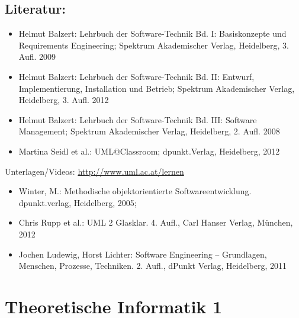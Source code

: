 \section*{Literatur:}\label{literatur-18}

\begin{itemize}
\item
  Helmut Balzert: Lehrbuch der Software-Technik Bd. I: Basiskonzepte und
  Requirements Engineering; Spektrum Akademischer Verlag, Heidelberg, 3.
  Aufl. 2009
\item
  Helmut Balzert: Lehrbuch der Software-Technik Bd. II: Entwurf,
  Implementierung, Installation und Betrieb; Spektrum Akademischer
  Verlag, Heidelberg, 3. Aufl. 2012
\item
  Helmut Balzert: Lehrbuch der Software-Technik Bd. III: Software
  Management; Spektrum Akademischer Verlag, Heidelberg, 2. Aufl. 2008
\item
  Martina Seidl et al.: UML@Classroom; dpunkt.Verlag, Heidelberg, 2012
\end{itemize}

Unterlagen/Videos: \url{http://www.uml.ac.at/lernen}

\begin{itemize}
\item
  Winter, M.: Methodische objektorientierte Softwareentwicklung.
  dpunkt.verlag, Heidelberg, 2005;
\item
  Chris Rupp et al.: UML 2 Glasklar. 4. Aufl., Carl Hanser Verlag,
  München, 2012
\item
  Jochen Ludewig, Horst Lichter: Software Engineering -- Grundlagen,
  Menschen, Prozesse, Techniken. 2. Aufl., dPunkt Verlag, Heidelberg,
  2011
\end{itemize}

\chapter{Theoretische Informatik 1}\label{theoretische-informatik-1}

